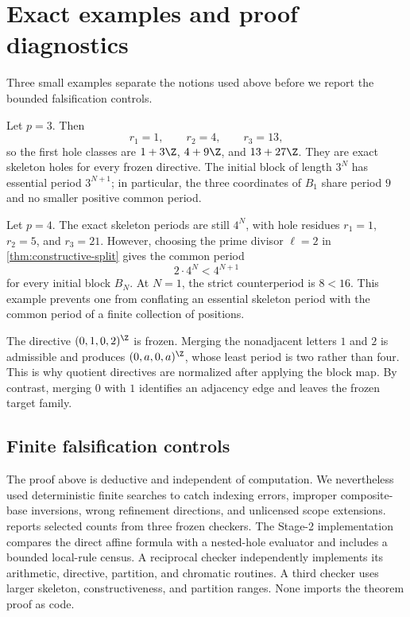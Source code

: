 \section{Exact examples and proof diagnostics}
\label{sec:examples}

Three small examples separate the notions used above before we report the
bounded falsification controls.

\begin{example}
\label{ex:prime-three}
  Let $p=3$.  Then
  \[
    r_1=1,\qquad r_2=4,\qquad r_3=13,
  \]
  so the first hole classes are $1+3\Z$, $4+9\Z$, and $13+27\Z$.
  They are exact skeleton holes for every frozen directive.  The initial
  block of length $3^N$ has essential period $3^{N+1}$; in particular, the
  three coordinates of $B_1$ share period $9$ and no smaller positive
  common period.
\end{example}

\begin{example}
\label{ex:composite-four}
  Let $p=4$.  The exact skeleton periods are still $4^N$, with hole
  residues $r_1=1$, $r_2=5$, and $r_3=21$.  However, choosing the prime
  divisor $\ell=2$ in \cref{thm:constructive-split} gives the common period
  \[
    2\cdot4^N<4^{N+1}
  \]
  for every initial block $B_N$.  At $N=1$, the strict counterperiod is
  $8<16$.  This example prevents one from conflating an essential skeleton
  period with the common period of a finite collection of positions.
\end{example}

\begin{example}
\label{ex:period-reduction}
  The directive $(0,1,0,2)^{\Z}$ is frozen.  Merging the nonadjacent letters
  $1$ and $2$ is admissible and produces $(0,a,0,a)^{\Z}$, whose least
  period is two rather than four.  This is why quotient directives are
  normalized after applying the block map.  By contrast, merging $0$ with
  $1$ identifies an adjacency edge and leaves the frozen target family.
\end{example}

\subsection{Finite falsification controls}
\label{subsec:diagnostics}

The proof above is deductive and independent of computation.  We
nevertheless used deterministic finite searches to catch indexing errors,
improper composite-base inversions, wrong refinement directions, and
unlicensed scope extensions.   reports selected
counts from three frozen checkers.  The Stage-2 implementation compares the
direct affine formula with a nested-hole evaluator and includes a bounded
local-rule census.  A reciprocal checker independently implements its
arithmetic, directive, partition, and chromatic routines.  A third checker
uses larger skeleton, constructiveness, and partition ranges.  None imports
the theorem proof as code.

